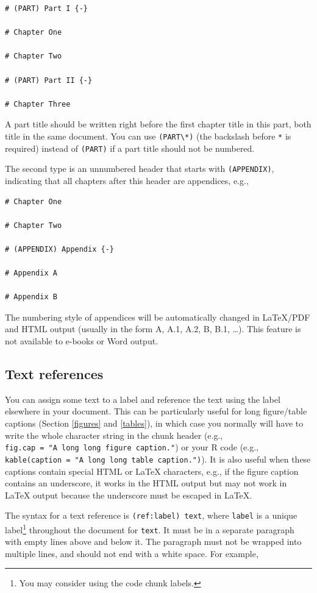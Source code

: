 \documentclass[
  12pt,
]{krantz}
\theoremstyle{definition}
\theoremstyle{definition}
\theoremstyle{definition}
\theoremstyle{definition}
\theoremstyle{remark}
\begin{document}
\begin{verbatim}
# (PART) Part I {-} 

# Chapter One

# Chapter Two

# (PART) Part II {-} 

# Chapter Three
\end{verbatim}

A part title should be written right before the first chapter title in this part, both title in the same document. You can use \texttt{(PART\textbackslash{}*)} (the backslash before \texttt{*} is required) instead of \texttt{(PART)} if a part title should not be numbered.

The second type is an unnumbered header that starts with \texttt{(APPENDIX)}, indicating that all chapters after this header are appendices, e.g.,

\begin{verbatim}
# Chapter One 

# Chapter Two

# (APPENDIX) Appendix {-} 

# Appendix A

# Appendix B
\end{verbatim}

The numbering style of appendices will be automatically changed in LaTeX/PDF and HTML output (usually in the form A, A.1, A.2, B, B.1, \ldots). This feature is not available to e-books or Word output.

\subsection{Text references}\label{text-references}

You can assign some text to a label and reference the text using the label elsewhere in your document. This can be particularly useful for long figure/table captions (Section \ref{figures} and \ref{tables}), in which case you normally will have to write the whole character string in the chunk header (e.g., \texttt{fig.cap\ =\ "A\ long\ long\ figure\ caption."}) or your R code (e.g., \texttt{kable(caption\ =\ "A\ long\ long\ table\ caption.")}). It is also useful when these captions contain special HTML or LaTeX characters, e.g., if the figure caption contains an underscore, it works in the HTML output but may not work in LaTeX output because the underscore must be escaped in LaTeX.

The syntax for a text reference is \texttt{(ref:label)\ text}, where \texttt{label} is a unique label\footnote{You may consider using the code chunk labels.} throughout the document for \texttt{text}. It must be in a separate paragraph with empty lines above and below it. The paragraph must not be wrapped into multiple lines, and should not end with a white space. For example,
\end{document}
